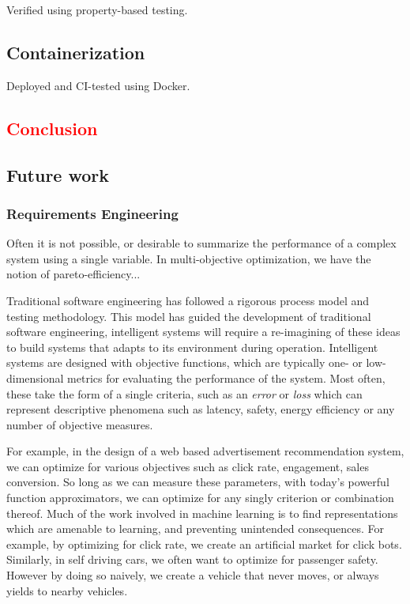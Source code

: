 \documentclass[12pt,initial,twoside,maitrise]{dms}
\newcommand{\rare}[1]{\textcolor{red}{#1}}
\numberwithin{equation}{section}
\numberwithin{table}{chapter}
\numberwithin{figure}{chapter}
\begin{document}
Verified using property-based testing.

\section{Containerization}

Deployed and CI-tested using Docker.

\rare{\chapter{Conclusion}\label{ch:conclusion}}

\section{Future work}

\subsection{Requirements Engineering}

Often it is not possible, or desirable to summarize the performance of a complex system using a single variable. In multi-objective optimization, we have the notion of pareto-efficiency...

Traditional software engineering has followed a rigorous process model and testing methodology. This model has guided the development of traditional software engineering, intelligent systems will require a re-imagining of these ideas to build systems that adapts to its environment during operation. Intelligent systems are designed with objective functions, which are typically one- or low-dimensional metrics for evaluating the performance of the system. Most often, these take the form of a single criteria, such as an \textit{error} or \textit{loss} which can represent descriptive phenomena such as latency, safety, energy efficiency or any number of objective measures.

For example, in the design of a web based advertisement recommendation system, we can optimize for various objectives such as click rate, engagement, sales conversion. So long as we can measure these parameters, with today's powerful function approximators, we can optimize for any singly criterion or combination thereof. Much of the work involved in machine learning is to find representations which are amenable to learning, and preventing unintended consequences. For example, by optimizing for click rate, we create an artificial market for click bots. Similarly, in self driving cars, we often want to optimize for passenger safety. However by doing so naively, we create a vehicle that never moves, or always yields to nearby vehicles.
\end{document}
